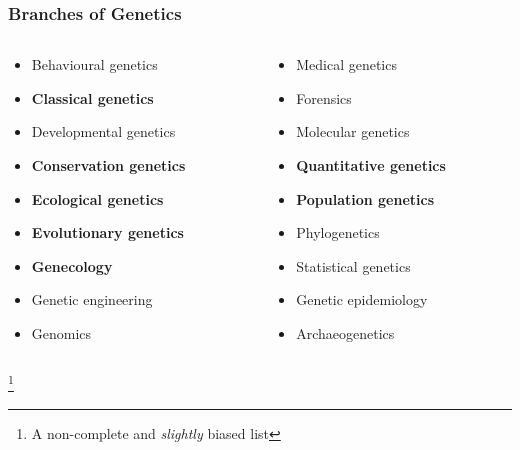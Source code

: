 \documentclass{beamer}
\newcommand\blfootnote[1]{%
	\begingroup
	\renewcommand\thefootnote{}\footnote{#1}%
	\addtocounter{footnote}{-1}%
	\endgroup
}
\begin{document}
\begin{frame}
	
	\frametitle{Branches of Genetics}
	
	\begin{columns}[T]
		
		\begin{column}{0.45\textwidth}
			\begin{itemize}
			\item{Behavioural genetics}
			\item{\textbf{Classical genetics}}
			\item{Developmental genetics}
			\item{\textbf{Conservation genetics}}
			\item{\textbf{Ecological genetics}}
			\item{\textbf{Evolutionary genetics}}
			\item{\textbf{Genecology}}
			\item{Genetic engineering}
			\item{Genomics}
			
			\end{itemize}
			
		\end{column}
		\begin{column}{.45\textwidth}
			\begin{itemize}
			\item{Medical genetics}
				\item{Forensics}
				\item{Molecular genetics}
				\item{\textbf{Quantitative genetics}}
				\item{\textbf{Population genetics}}
				\item{Phylogenetics}
				\item{Statistical genetics}
				\item{Genetic epidemiology}
				\item{Archaeogenetics}
			\end{itemize}
		\end{column}
		\end{columns}
		\blfootnote{A non-complete and \textit{slightly} biased list}
\end{frame}
\end{document}
